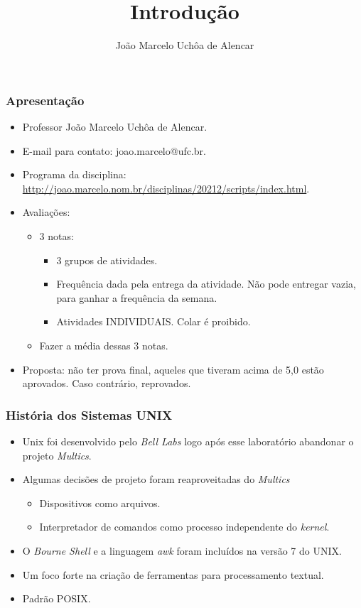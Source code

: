 \documentclass{beamer}
\title{Introdução}
\author[João Marcelo Uchôa de Alencar]{João Marcelo Uchôa de Alencar}
\institute{Universidade Federal do Ceará - Quixadá}
\begin{document}
   \begin{frame}
      \titlepage
   \end{frame}


\begin{frame}
   \frametitle{Apresentação}
   \begin{itemize}
      \item Professor João Marcelo Uchôa de Alencar.
      \item E-mail para contato: joao.marcelo@ufc.br.
      \item Programa da disciplina: \url{http://joao.marcelo.nom.br/disciplinas/20212/scripts/index.html}.
      \item Avaliações:
      \begin{itemize}
         \item 3 notas: 
	      \begin{itemize}
            \item 3 grupos de atividades.
            \item Frequência dada pela entrega da atividade. Não pode entregar vazia, para ganhar a frequência da semana.
            \item Atividades INDIVIDUAIS. Colar é proibido. 
         \end{itemize}
	      \item Fazer a média dessas 3 notas. 
      \end{itemize}
      \item Proposta: não ter prova final, aqueles que tiveram acima de 5,0 estão aprovados. Caso contrário, reprovados.
   \end{itemize}
\end{frame}


\begin{frame}
   \frametitle{História dos Sistemas UNIX}
   \begin{itemize}
      \item Unix foi desenvolvido pelo \textit{Bell Labs} logo após esse laboratório abandonar o projeto \textit{Multics}.
      \item Algumas decisões de projeto foram reaproveitadas do \textit{Multics}
      \begin{itemize}
         \item Dispositivos como arquivos.
	 \item Interpretador de comandos como processo independente do \textit{kernel}.
      \end{itemize}
      \item O \textit{Bourne Shell} e a linguagem \textit{awk} foram incluídos na versão 7 do UNIX.
      \item Um foco forte na criação de ferramentas para processamento textual.
      \item Padrão POSIX.
   \end{itemize}
\end{frame}
\end{document}
